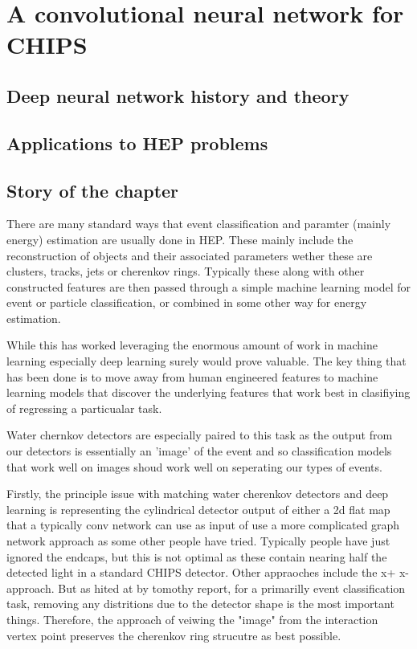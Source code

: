 \chapter{A convolutional neural network for CHIPS}
\label{chap:cvn}

\section{Deep neural network history and theory}

\section{Applications to HEP problems}

\section{Story of the chapter}

There are many standard ways that event classification and paramter (mainly energy) estimation are
usually done in HEP. These mainly include the reconstruction of objects and their associated parameters
wether these are clusters, tracks, jets or cherenkov rings. Typically these along with other constructed
features are then passed through a simple machine learning model for event or particle classification, or
combined in some other way for energy estimation.

While this has worked leveraging the enormous amount of work in machine learning especially deep learning
surely would prove valuable. The key thing that has been done is to move away from human engineered features
to machine learning models that discover the underlying features that work best in clasifiying of regressing
a particualar task.

Water chernkov detectors are especially paired to this task as the output from our detectors is essentially
an 'image' of the event and so classification models that work well on images shoud work well on
seperating our types of events.

Firstly, the principle issue with matching water cherenkov detectors and deep learning is representing the cylindrical
detector output of either a 2d flat map that a typically conv network can use as input of use a more complicated
graph network approach as some other people have tried. Typically people have just ignored the endcaps, but
this is not optimal as these contain nearing half the detected light in a standard CHIPS detector. Other appraoches
include the x+ x- approach. But as hited at by tomothy report, for a primarilly event classification task,
removing any distritions due to the detector shape is the most important things. Therefore, the approach of
veiwing the "image" from the interaction vertex point preserves the cherenkov ring strucutre as best possible.

